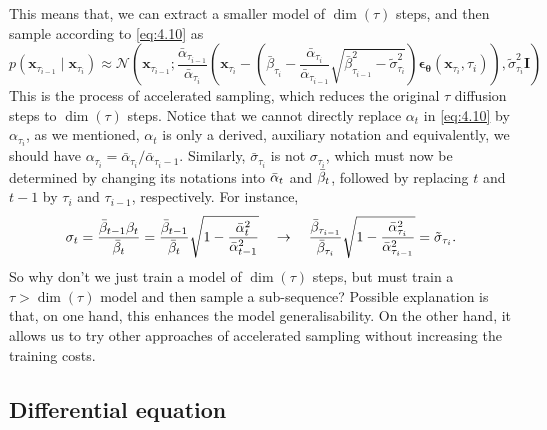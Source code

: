 This means that, we can extract a smaller model of $\dim(\tau)$ steps, and then sample according to \cref{eq:4.10} as 
\begin{equation}
p\left(\boldsymbol{x}_{\tau_{i-1}} \mid \boldsymbol{x}_{\tau_i}\right) \approx \mathcal{N}\left(\boldsymbol{x}_{\tau_{i-1}} ; \frac{\bar{\alpha}_{\tau_{i-1}}}{\bar{\alpha}_{\tau_i}}\left(\boldsymbol{x}_{\tau_i}-\left(\bar{\beta}_{\tau_i}-\frac{\bar{\alpha}_{\tau_i}}{\bar{\alpha}_{\tau_{i-1}}} \sqrt{\bar{\beta}_{\tau_{i-1}}^2-\tilde{\sigma}_{\tau_i}^2}\right) \boldsymbol{\epsilon}_{\boldsymbol{\theta}}\left(\boldsymbol{x}_{\tau_i}, \tau_i\right)\right), \tilde{\sigma}_{\tau_i}^2 \boldsymbol{I}\right)
\end{equation}
This is the process of accelerated sampling, which reduces the original $\tau$ diffusion steps to $\dim(\tau)$ steps. Notice that we cannot directly replace $\alpha_t$ in \cref{eq:4.10} by $\alpha_{\tau_i}$, as we mentioned, $\alpha_t$ is only a derived, auxiliary notation and equivalently, we should have $\alpha_{\tau_i}=\bar{\alpha}_{\tau_i}/\bar{\alpha}_{\tau_i-1}$. Similarly, $\bar{\sigma}_{\tau_i}$ is not $\sigma_{\tau_i}$, which must now be determined by changing its notations into $\bar{\alpha}_t$ and $\bar{\beta}_t$, followed by replacing $t$ and $t-1$ by $\tau_i$ and $\tau_{i-1}$, respectively. For instance,
\begin{equation}
    \sigma_t=\frac{\bar{\beta}_{t-1}\beta_t}{\bar{\beta}_t}=\frac{\bar{\beta}_{t-1}}{\bar{\beta}_t}\sqrt{1-\frac{\bar{\alpha}_t^2}{\bar{\alpha}_{t-1}^2}}\quad\to \quad \frac{\bar{\beta}_{\tau_{i-1}}}{\bar{\beta}_{\tau_i}} \sqrt{1-\frac{\bar{\alpha}_{\tau_i}^2}{\bar{\alpha}_{\tau_{i-1}}^2}}=\tilde{\sigma}_{\tau_i}. \label{eq:4.14}
\end{equation}
So why don't we just train a model of $\dim(\tau)$ steps, but must train a $\tau>\dim(\tau)$ model and then sample a sub-sequence? Possible explanation is that, on one hand, this enhances the model generalisability. On the other hand, it allows us to try other approaches of accelerated sampling without increasing the training costs.

\subsection{Differential equation}

